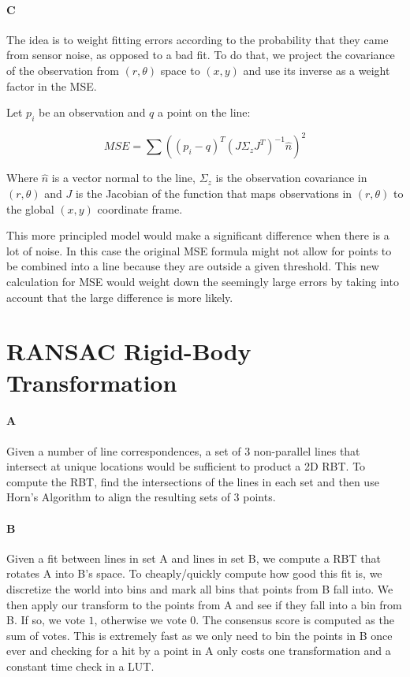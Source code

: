 \documentclass[12pt]{article}
\begin{document}
\paragraph{C}
The idea is to weight fitting errors according to the probability that they came from sensor noise, as opposed to a bad fit. To do that, we project the covariance of the observation from $(r,\theta)$ space to $(x,y)$ and use its inverse as a weight factor in the MSE.

Let $p_i$ be an observation and $q$ a point on the line:

\[MSE = \sum{\left((p_i-q)^T\left(J\Sigma_zJ^T\right)^{-1}\hat{n}\right)^2} \]

Where $\hat{n}$ is a vector normal to the line, $\Sigma_z$ is the observation covariance in $(r,\theta)$ and $J$ is the Jacobian of the function that maps observations in $(r,\theta)$ to the global $(x,y)$ coordinate frame.

This more principled model would make a significant difference when there is a lot of noise.  In this case the original MSE formula might not allow for points to be combined into a line because they are outside a given threshold.  This new calculation for MSE would weight down the seemingly large errors by taking into account that the large difference is more likely.
\section{RANSAC Rigid-Body Transformation}

\paragraph{A}
Given a number of line correspondences, a set of 3 non-parallel lines that
intersect at unique locations would be sufficient to product a 2D RBT. To
compute the RBT, find the intersections of the lines in each set and then
use Horn's Algorithm to align the resulting sets of 3 points.

\paragraph{B}
Given a fit between lines in set A and lines in set B, we compute a RBT that
rotates A into B's space. To cheaply/quickly compute how good this fit is,
we discretize the world into bins and mark all bins that points from B fall
into. We then apply our transform to the points from A and see if they fall
into a bin from B. If so, we vote $1$, otherwise we vote $0$. The consensus
score is computed as the sum of votes. This is extremely fast as we only need
to bin the points in B once ever and checking for a hit by a point in A only
costs one transformation and a constant time check in a LUT.
\end{document}
